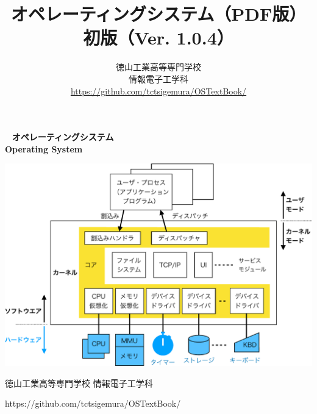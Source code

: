\documentclass[a4paper,11pt,twocolumn]{ltjsbook}     %
\newif\ifPDF
\newcommand{\pdf}{（PDF版）}
\newcommand{\pdf}{}
\newcommand{\edition}{初版}
\newcommand{\ver}{Ver. 1.0.4}
\begin{document}
\setcounter{page}{0}
\thispagestyle{empty}
\onecolumn
~
\vfill
\vfill
{\noindent
\fontsize{34pt}{50pt}\selectfont\textbf{オペレーティングシステム}\\
\fontsize{34pt}{50pt}\selectfont\textbf{Operating System}
}
\vfill
\vfill
\centerline{
  \includegraphics[scale=0.77]{Fig/osOrganization-crop.pdf}
}
\vfill
\vfill
\centerline{\Large 徳山工業高等専門学校 情報電子工学科}
\centerline{\Large\ttfamily https://github.com/tctsigemura/OSTextBook/}
\vfill

\ifPDF
\newpage
\setcounter{page}{0}
\thispagestyle{empty}
\onecolumn
~
\fi

\frontmatter
\title{オペレーティングシステム{\pdf}\\{\edition}（{\ver}）}
\author{徳山工業高等専門学校\\情報電子工学科\\
\url{https://github.com/tctsigemura/OSTextBook/}}
\date{}
\maketitle
\end{document}
